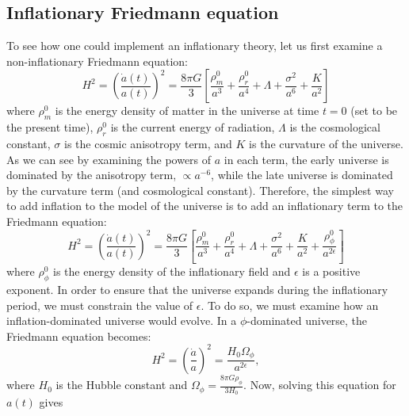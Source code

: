 \documentclass[a4paper,11pt]{article}
\newcommand{\mep}[1]{{\color{applegreen} \textbf{[MEP:  #1]}}}
\begin{document}
\subsection{Inflationary Friedmann equation}
\label{sec:InflationaryFriedmann}
To see how one could implement an inflationary theory, let us first examine a non-inflationary Friedmann equation:
\begin{equation}
H^2 = \left ( \frac{\dot a(t)}{a(t)} \right ) ^2 = \frac{8 \pi G}{3} \left [ \frac{\rho^0_m}{a^3} + \frac{\rho^0_r}{a^4} + \Lambda + \frac{\sigma^2}{a^6} + \frac{K}{a^2} \right ]
\end{equation}
where $\rho^0_m$ is the energy density of matter in the universe at time $t=0$ (set to be the present time), $\rho^0_r$ is the current energy of radiation, $\Lambda$ is the cosmological constant, $\sigma$ is the cosmic anisotropy term, and $K$ is the curvature of the universe. As we can see by examining the powers of $a$ in each term, the early universe is dominated by the anisotropy term, $\propto a^{-6}$, while the late universe is dominated by the curvature term (and cosmological constant). Therefore, the simplest way to add inflation to the model of the universe is to add an inflationary term to the Friedmann equation: 
\begin{equation}
H^2 = \left ( \frac{\dot a(t)}{a(t)} \right ) ^2 = \frac{8 \pi G}{3} \left [ \frac{\rho^0_m}{a^3} + \frac{\rho^0_r}{a^4} + \Lambda + \frac{\sigma^2}{a^6} + \frac{K}{a^2} + \frac{\rho^0_\phi}{a^{2\epsilon}} \right ]
\end{equation}
where $\rho^0_\phi$ is the energy density of the inflationary field and $\epsilon$ is a positive exponent. In order to ensure that the universe expands during the inflationary period, we must constrain the value of $\epsilon$. 
To do so, we must examine how an inflation-dominated universe would evolve. In a $\phi$-dominated universe, the Friedmann equation becomes:
\begin{equation}
H^2 = \left ( \frac{\dot a}{a} \right ) ^2 = \frac{H_0 \Omega_\phi}{a^{2\epsilon}},
\label{eqn:Friedmann_phi}
\end{equation}
where $H_0$ is the Hubble constant and $\Omega_\phi = \tfrac{8\pi G \rho_\phi}{3 H_0}$. Now, solving this equation for $a(t)$ gives
\end{document}
